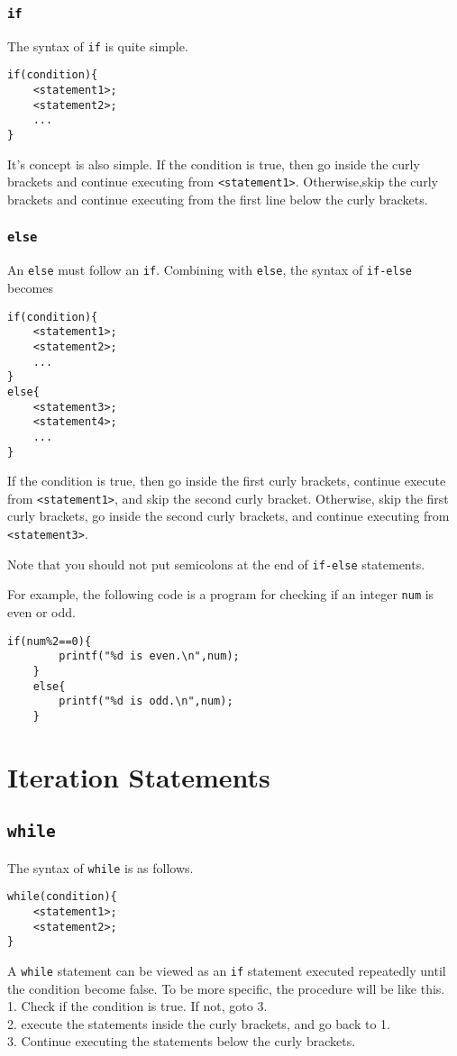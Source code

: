 \documentclass{report}
\begin{document}
    \subsubsection{\texttt{if}}
    The syntax of \texttt{if} is quite simple.
    \begin{lstlisting}[xleftmargin=.4\textwidth]
if(condition){
    <statement1>;
    <statement2>;
    ...
}
    \end{lstlisting}
    It's concept is also simple. If the condition is true, then go inside the curly brackets and continue executing from \texttt{<statement1>}. Otherwise,skip the curly brackets and continue executing from the first line below the curly brackets.
    \subsubsection{\texttt{else}}
    An \texttt{else} must follow an \texttt{if}. Combining with \texttt{else}, the syntax of \texttt{if-else} becomes
    \begin{lstlisting}[xleftmargin=.4\textwidth]
if(condition){
    <statement1>;
    <statement2>;
    ...
}
else{
    <statement3>;
    <statement4>;
    ...
}
    \end{lstlisting}
    If the condition is true, then go inside the first curly brackets, continue execute from \texttt{<statement1>}, and skip the second curly bracket. Otherwise, skip the first curly brackets, go inside the second curly brackets, and continue executing from \texttt{<statement3>}.

    Note that you should not put semicolons at the end of \texttt{if-else} statements.
    
    For example, the following code is a program for checking if an integer \texttt{num} is even or odd.
\begin{lstlisting}[style=CStyle]
    if(num%2==0){
        printf("%d is even.\n",num);
    }
    else{
        printf("%d is odd.\n",num);
    }
\end{lstlisting}
\section{Iteration Statements}
    \subsection{\texttt{while}}
    The syntax of \texttt{while} is as follows.
    \begin{lstlisting}[xleftmargin=.4\textwidth]
while(condition){
    <statement1>;
    <statement2>;
}
    \end{lstlisting}
    A \texttt{while} statement can be viewed as an \texttt{if} statement executed repeatedly until the condition become false. To be more specific, the procedure will be like this.\\
    1. Check if the condition is true. If not, goto 3.\\
    2. execute the statements inside the curly brackets, and go back to 1.\\
    3. Continue executing the statements below the curly brackets.
    
\end{document}
